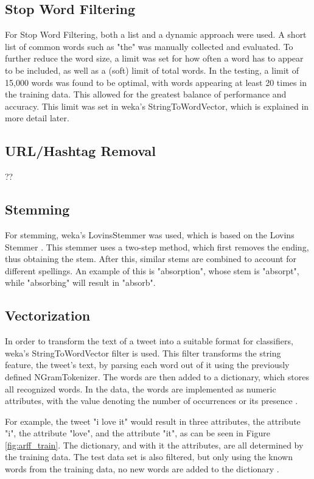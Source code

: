 \subsection{Stop Word Filtering}
For Stop Word Filtering, both a list and a dynamic approach were used. A short list of common words such as "the" was manually collected and evaluated. To further reduce the word size, a limit was set for how often a word has to appear to be included, as well as a (soft) limit of total words. In the testing, a limit of 15,000 words was found to be optimal, with words appearing at least 20 times in the training data. This allowed for the greatest balance of performance and accuracy. This limit was set in weka's StringToWordVector, which is explained in more detail later.
\subsection{URL/Hashtag Removal}
??

\subsection{Stemming}
For stemming, weka's LovinsStemmer was used, which is based on the Lovins Stemmer \cite{weka}. This stemmer uses a two-step method, which first removes the ending, thus obtaining the stem. After this, similar stems are combined to account for different spellings. An example of this is "absorption", whose stem is "absorpt", while "absorbing" will result in "absorb"\cite{Lovins1968DevelopmentOA}.

\subsection{Vectorization}
In order to transform the text of a tweet into a suitable format for classifiers, weka's StringToWordVector filter is used. This filter transforms the string feature, the tweet's text, by parsing each word out of it using the previously defined NGramTokenizer. The words are then added to a dictionary, which stores all recognized words. In the data, the words are implemented as numeric attributes, with the value denoting the number of occurrences or its presence \cite{weka}.

For example, the tweet "i love it" would result in three attributes, the attribute "i", the attribute "love", and the attribute "it", as can be seen in Figure \ref{fig:arff_train}. The dictionary, and with it the attributes, are all determined by the training data. The test data set is also filtered, but only using the known words from the training data, no new words are added to the dictionary \cite{weka}.




